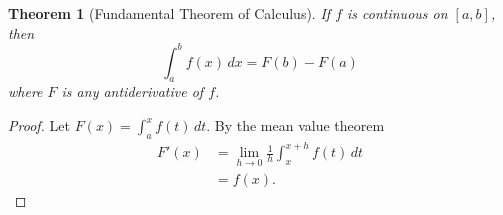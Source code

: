 \documentclass{article}
\newtheorem{theorem}{Theorem}
\begin{document}
\begin{theorem}[Fundamental Theorem of Calculus]
If $f$ is continuous on $[a,b]$, then
\[
  \int_a^b f(x)\,dx = F(b) - F(a)
\]
where $F$ is any antiderivative of $f$.
\end{theorem}
\begin{proof}
Let $F(x) = \int_a^x f(t)\,dt$. By the mean value theorem
\begin{align*}
  F'(x) &= \lim_{h \to 0} \frac{1}{h}\int_x^{x+h} f(t)\,dt \\
        &= f(x).
\end{align*}
\end{proof}
\end{document}
